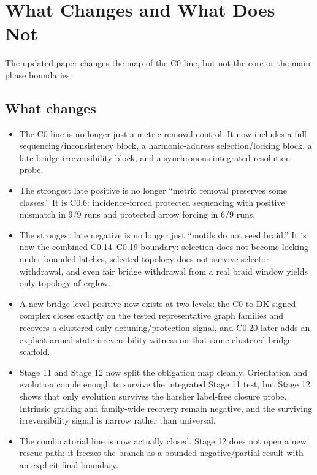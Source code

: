 \documentclass[11pt]{article}
\begin{document}
\section{What Changes and What Does Not}

The updated paper changes the map of the C0 line, but not the core or the main phase boundaries.

\subsection{What changes}

\begin{itemize}
\item The C0 line is no longer just a metric-removal control. It now includes a full sequencing/inconsistency block, a harmonic-address selection/locking block, a late bridge irreversibility block, and a synchronous integrated-resolution probe.
\item The strongest late positive is no longer ``metric removal preserves some classes.'' It is C0.6: incidence-forced protected sequencing with positive mismatch in $9/9$ runs and protected arrow forcing in $6/9$ runs.
\item The strongest late negative is no longer just ``motifs do not seed braid.'' It is now the combined C0.14--C0.19 boundary: selection does not become locking under bounded latches, selected topology does not survive selector withdrawal, and even fair bridge withdrawal from a real braid window yields only topology afterglow.
\item A new bridge-level positive now exists at two levels: the C0-to-DK signed complex closes exactly on the tested representative graph families and recovers a clustered-only detuning/protection signal, and C0.20 later adds an explicit armed-state irreversibility witness on that same clustered bridge scaffold.
\item Stage 11 and Stage 12 now split the obligation map cleanly. Orientation and evolution couple enough to survive the integrated Stage 11 test, but Stage 12 shows that only evolution survives the harsher label-free closure probe. Intrinsic grading and family-wide recovery remain negative, and the surviving irreversibility signal is narrow rather than universal.
\item The combinatorial line is now actually closed. Stage 12 does not open a new rescue path; it freezes the branch as a bounded negative/partial result with an explicit final boundary.
\end{itemize}
\end{document}
